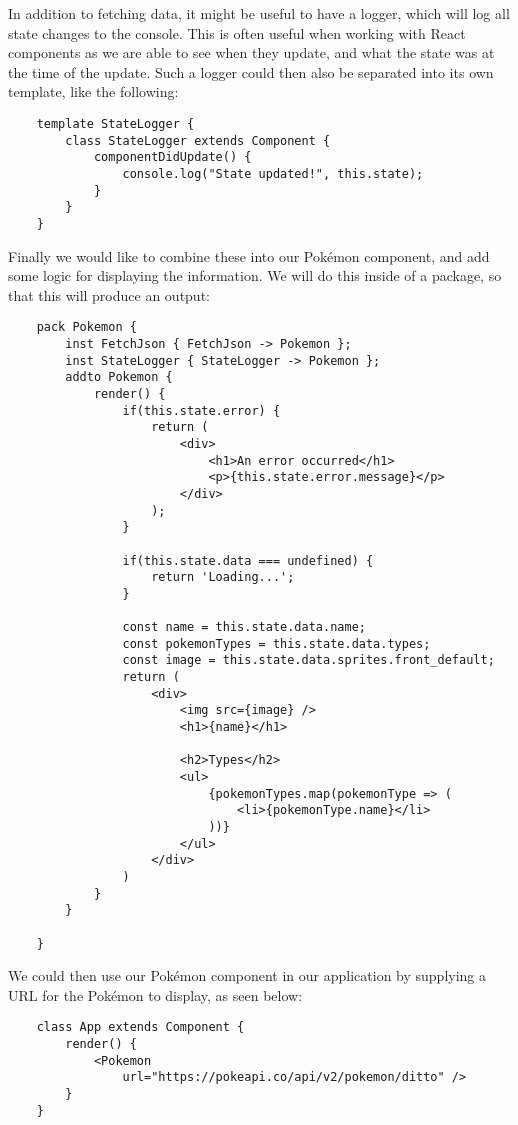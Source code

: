 In addition to fetching data, it might be useful to have a logger, which will log all state changes to the console.
This is often useful when working with React components as we are able to see when they update, and what the state was at the time of the update.
Such a logger could then also be separated into its own template, like the following:

\begin{verbatim}
    template StateLogger {
        class StateLogger extends Component {
            componentDidUpdate() {
                console.log("State updated!", this.state);
            }
        }
    }
\end{verbatim}

Finally we would like to combine these into our Pokémon component, and add some logic for displaying the information.
We will do this inside of a package, so that this will produce an output:

\begin{verbatim}
    pack Pokemon {
        inst FetchJson { FetchJson -> Pokemon };
        inst StateLogger { StateLogger -> Pokemon };
        addto Pokemon {
            render() {
                if(this.state.error) {
                    return (
                        <div>
                            <h1>An error occurred</h1>
                            <p>{this.state.error.message}</p>
                        </div>
                    );
                }

                if(this.state.data === undefined) {
                    return 'Loading...';
                }

                const name = this.state.data.name;
                const pokemonTypes = this.state.data.types;
                const image = this.state.data.sprites.front_default;
                return (
                    <div>
                        <img src={image} />
                        <h1>{name}</h1>

                        <h2>Types</h2>
                        <ul>
                            {pokemonTypes.map(pokemonType => (
                                <li>{pokemonType.name}</li>
                            ))}
                        </ul>
                    </div>
                )
            }
        }

    }
\end{verbatim}

We could then use our Pokémon component in our application by supplying a URL for the Pokémon to display, as seen below:

\begin{verbatim}
    class App extends Component {
        render() {
            <Pokemon
                url="https://pokeapi.co/api/v2/pokemon/ditto" />
        }
    }
\end{verbatim}

